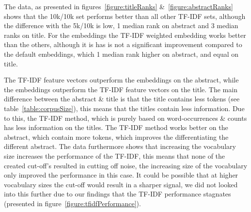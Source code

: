 \documentclass[../../Thesis.tex]{subfiles}
\begin{document}

\begin{jumpin}
The data, as presented in figures~\ref{figure:titleRanks} \&~\ref{figure:abstractRanks} shows that the 10k/10k set performs better than all other TF-IDF sets, although the difference with the 5k/10k is low, 1  median rank on abstract and 3 median ranks on title. For the embeddings the TF-IDF weighted embedding works better than the others, although it is has is not a significant improvement compared to the default embeddings, which 1 median rank higher on abstract, and equal on title. 

The TF-IDF feature vectors outperform the embeddings on the abstract, while the embeddings outperform the TF-IDF feature vectors on the title. The main difference between the abstract \& title is that the title contains less tokens (see table~\ref{table:corpusSize}), this means that the titles contain less information. Due to this, the TF-IDF method, which is purely based on word-occurrences \& counts has less information on the titles. The TF-IDF method works better on the abstract, which contain more tokens, which improves the differentiating the different abstract. The data furthermore shows that increasing the vocabulary size increases the performance of the TF-IDF, this means that none of the created cut-off's resulted in cutting off noise, the increasing size of the vocabulary only improved the performance in this case. It could be possible that at higher vocabulary sizes the cut-off would result in a sharper signal, we did not looked into this further due to our findings that the TF-IDF performance stagnates (presented in figure~\ref{figure:tfidfPerformance}).


\end{jumpin}
\end{document}
